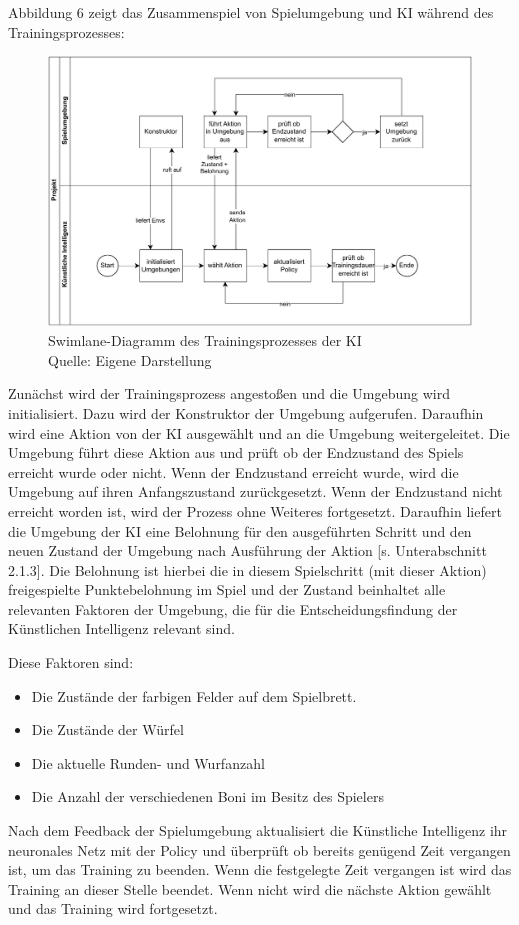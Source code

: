 Abbildung 6 zeigt das Zusammenspiel von Spielumgebung und KI während des Trainingsprozesses:

\nopagebreak
\begin{figure}[H]
	\includegraphics[width=1\textwidth]{Bilder/swimlane.drawio.pdf} 
	\caption[Swimlane-Diagramm des Trainingsprozesses der KI]{Swimlane-Diagramm des Trainingsprozesses der KI\\ Quelle: Eigene Darstellung}
\end{figure}	

Zunächst wird der Trainingsprozess angestoßen und die Umgebung wird initialisiert. Dazu wird der Konstruktor der Umgebung aufgerufen. Daraufhin wird eine Aktion von der KI ausgewählt und an die Umgebung weitergeleitet. Die Umgebung führt diese Aktion aus und prüft ob der Endzustand des Spiels erreicht wurde oder nicht. Wenn der Endzustand erreicht wurde, wird die Umgebung auf ihren Anfangszustand zurückgesetzt. Wenn der Endzustand nicht erreicht worden ist, wird der Prozess ohne Weiteres fortgesetzt. Daraufhin liefert die Umgebung der KI eine Belohnung für den ausgeführten Schritt und den neuen Zustand der Umgebung nach Ausführung der Aktion [s. Unterabschnitt 2.1.3]. Die Belohnung ist hierbei die in diesem Spielschritt (mit dieser Aktion) freigespielte Punktebelohnung im Spiel und der Zustand beinhaltet alle relevanten Faktoren der Umgebung, die für die Entscheidungsfindung der Künstlichen Intelligenz relevant sind. 

Diese Faktoren sind:
\begin{itemize} 
\item Die Zustände der farbigen Felder auf dem Spielbrett.
\item Die Zustände der Würfel
\item Die aktuelle Runden- und Wurfanzahl
\item Die Anzahl der verschiedenen Boni im Besitz des Spielers
\end{itemize}
Nach dem Feedback der Spielumgebung aktualisiert die Künstliche Intelligenz ihr neuronales Netz mit der Policy und überprüft ob bereits genügend Zeit vergangen ist, um das Training zu beenden. Wenn die festgelegte Zeit vergangen ist wird das Training an dieser Stelle beendet. Wenn nicht wird die nächste Aktion gewählt und das Training wird fortgesetzt.

